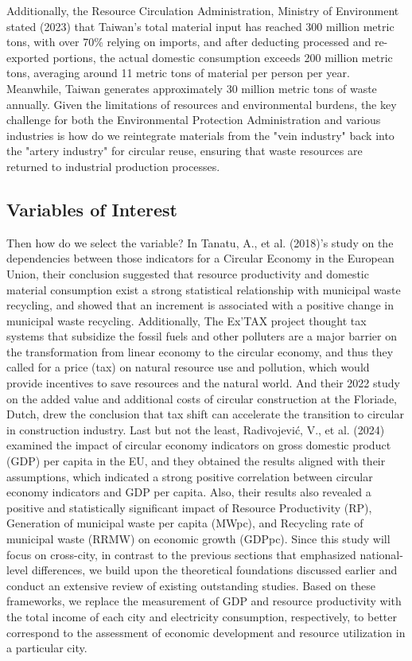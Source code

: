 \documentclass{article}
\begin{document}
Additionally, the Resource Circulation Administration, Ministry of Environment stated (2023) that Taiwan's total material input has reached 300 million metric tons, with over 70\% relying on imports, and after deducting processed and re-exported portions, the actual domestic consumption exceeds 200 million metric tons, averaging around 11 metric tons of material per person per year.
Meanwhile, Taiwan generates approximately 30 million metric tons of waste annually. Given the limitations of resources and environmental burdens, the key challenge for both the Environmental Protection Administration and various industries is how do we reintegrate materials from the "vein industry" back into the "artery industry" for circular reuse,
ensuring that waste resources are returned to industrial production processes.

\subsection{Variables of Interest}
Then how do we select the variable? In Tanatu, A., et al. (2018)'s study on the dependencies between those indicators for a Circular Economy in the European Union, their conclusion suggested that resource productivity and domestic material consumption exist a strong statistical relationship with municipal waste recycling, and showed that an increment is associated with a positive change in municipal waste recycling.
Additionally, The Ex'TAX project thought tax systems that subsidize the fossil fuels and other polluters are a major barrier on the transformation from linear economy to the circular economy, and thus they called for a price (tax) on natural resource use and pollution, which would provide incentives to save resources and the natural world. And their 2022 study on the added value and additional costs of circular construction at the Floriade, Dutch, drew the conclusion that tax shift can accelerate the transition to circular in construction industry.
Last but not the least, Radivojević, V., et al. (2024) examined the impact of circular economy indicators on gross domestic product (GDP) per capita in the EU, and they obtained the results aligned with their assumptions, which indicated a strong positive correlation between circular economy indicators and GDP per capita. Also, their results also revealed a positive and statistically significant impact of Resource Productivity (RP), Generation of municipal waste per capita (MWpc), and Recycling rate of municipal waste (RRMW) on economic growth (GDPpc).
Since this study will focus on cross-city, in contrast to the previous sections that emphasized national-level differences, we build upon the theoretical foundations discussed earlier and conduct an extensive review of existing outstanding studies. Based on these frameworks, we replace the measurement of GDP and resource productivity with the total income of each city and electricity consumption, respectively, to better correspond to the assessment of economic development and resource utilization in a particular city.
\end{document}
